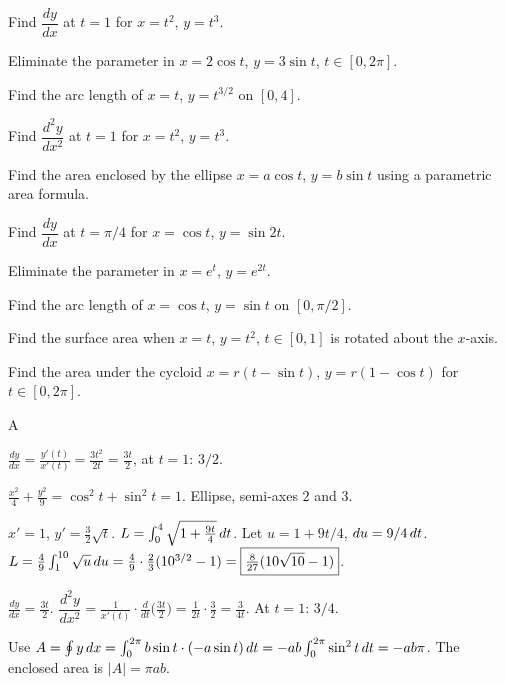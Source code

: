 \documentclass[11pt]{article}
\begin{document}
\begin{problems}
\item Find $\dfrac{dy}{dx}$ at $t = 1$ for $x = t^2$, $y = t^3$.
\item Eliminate the parameter in $x = 2\cos t$, $y = 3\sin t$, $t \in [0, 2\pi]$.
\item Find the arc length of $x = t$, $y = t^{3/2}$ on $[0, 4]$.
\item Find $\dfrac{d^2 y}{dx^2}$ at $t = 1$ for $x = t^2$, $y = t^3$.
\item Find the area enclosed by the ellipse $x = a \cos t$, $y = b \sin t$ using a parametric area formula.
\end{problems}

\vfill
\newpage
{}
\begin{problems}
\item Find $\dfrac{dy}{dx}$ at $t = \pi/4$ for $x = \cos t$, $y = \sin 2t$.
\item Eliminate the parameter in $x = e^t$, $y = e^{2t}$.
\item Find the arc length of $x = \cos t$, $y = \sin t$ on $[0, \pi/2]$.
\item Find the surface area when $x = t$, $y = t^2$, $t \in [0, 1]$ is rotated about the $x$-axis.
\item Find the area under the cycloid $x = r(t - \sin t)$, $y = r(1 - \cos t)$ for $t \in [0, 2\pi]$.
\end{problems}

\vfill
\newpage
{}

\begin{answers}{A}
\item $\tfrac{dy}{dx} = \tfrac{y'(t)}{x'(t)} = \tfrac{3t^2}{2t} = \tfrac{3t}{2}$, at $t=1$: $\boxed{3/2}$.
\item $\tfrac{x^2}{4} + \tfrac{y^2}{9} = \cos^2 t + \sin^2 t = 1$. Ellipse, semi-axes $2$ and $3$.
\item $x' = 1$, $y' = \tfrac{3}{2}\sqrt t$. $L = \int_0^4 \sqrt{1 + \tfrac{9t}{4}} \,dt$. Let $u = 1 + 9t/4$, $du = 9/4 \,dt$. $L = \tfrac{4}{9} \int_1^{10} \sqrt u \,du = \tfrac{4}{9} \cdot \tfrac{2}{3} (10^{3/2} - 1) = \boxed{\tfrac{8}{27}(10\sqrt{10} - 1)}$.
\item $\tfrac{dy}{dx} = \tfrac{3t}{2}$. $\dfrac{d^2 y}{dx^2} = \tfrac{1}{x'(t)} \cdot \tfrac{d}{dt}\!\bigl(\tfrac{3t}{2}\bigr) = \tfrac{1}{2t} \cdot \tfrac{3}{2} = \tfrac{3}{4t}$. At $t=1$: $\boxed{3/4}$.
\item Use $A = \oint y \,dx = \int_0^{2\pi} b \sin t \cdot (-a \sin t) \,dt = -ab \int_0^{2\pi} \sin^2 t \,dt = -ab \pi$. The enclosed area is $|A| = \boxed{\pi a b}$.
\end{answers}
\end{document}
